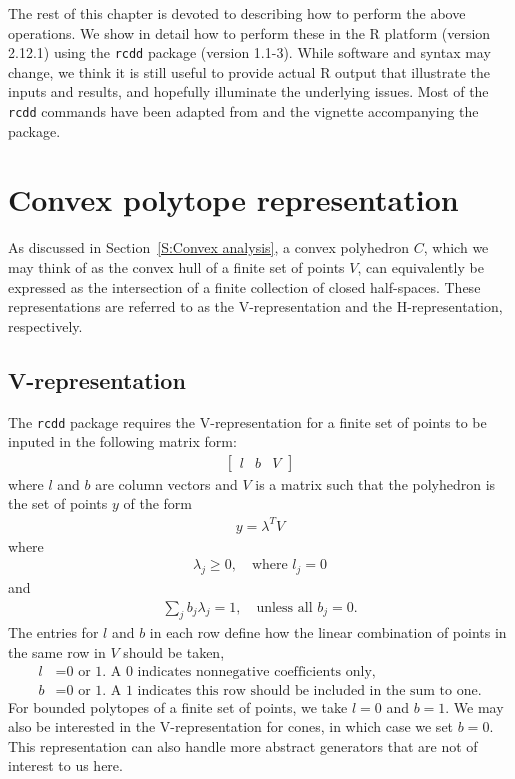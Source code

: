 The rest of this chapter is devoted to describing how to perform the above
operations.  We show in detail how to perform these in the R platform (version 2.12.1)
using the \texttt{rcdd} package (version 1.1-3).  While software and syntax may change,
we think it is still useful to provide actual R output that illustrate the
inputs and results, and hopefully illuminate the underlying issues.  Most of the  
\texttt{rcdd} commands have been adapted from \citet{Geyer:2009} and the vignette accompanying the package.

\section{Convex polytope representation}
As discussed in Section~\ref{S:Convex analysis}, a convex polyhedron $C$, which we 
may think of as the convex hull of a finite set of points $V$, can equivalently
be expressed as the intersection of a finite collection of closed half-spaces.  These
representations are referred to as the V-representation and the H-representation, 
respectively.

\subsection{V-representation} \label{S:V-rep}
The \texttt{rcdd} package requires the V-representation for a finite set of points 
to be inputed in the following matrix form:
\begin{align} \label{E:V-rep}
	\left[\begin{array}{ccc}l & b & V\end{array}\right]
\end{align}
where $l$ and $b$ are column vectors and $V$ is a matrix such that the polyhedron
is the set of points $y$ of the form
\begin{align*}
	y = \lambda^T V
\end{align*}
where
\begin{align*}
	\lambda_j \geq 0, \quad \text{where $l_j = 0$}
\end{align*}
and 
\begin{align*}
	\sum_j b_j \lambda_j = 1, \quad \text{unless all $b_j = 0$.}
\end{align*}
The entries for $l$ and $b$ in each row define how the linear combination of 
points in the same row in $V$ should be taken,
\begin{align*}
	l &= \text{0 or 1.  A 0 indicates nonnegative coefficients only,}\\
	b &= \text{0 or 1.  A 1 indicates this row should be included in the sum to one.}
\end{align*}
For bounded polytopes of a finite set of points, we take $l = 0$ and $b = 1$.  
We may also be interested in the V-representation for cones, in 
which case we set $b=0$.  
This representation can also handle more abstract generators that 
are not of interest to us here.

